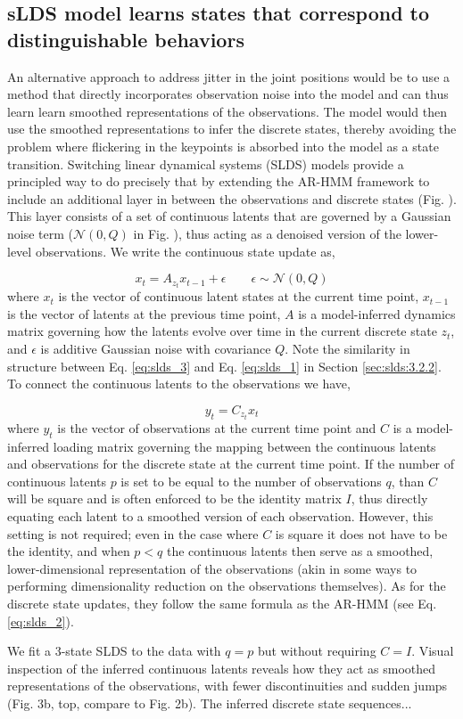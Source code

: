 \subsection{sLDS model learns states that correspond to distinguishable behaviors}
\label{sec:slds:3.2.3}
An alternative approach to address jitter in the joint positions would be to use a method that directly incorporates observation noise into the model and can thus learn learn smoothed representations of the observations. The model would then use the smoothed representations to infer the discrete states, thereby avoiding the problem where flickering in the keypoints is absorbed into the model as a state transition. Switching linear dynamical systems (SLDS) models provide a principled way to do precisely that by extending the AR-HMM framework to include an additional layer in between the observations and discrete states (Fig. ). This layer consists of a set of continuous latents that are governed by a Gaussian noise term ($\mathcal{N}(0,Q)$ in Fig. ), thus acting as a denoised version of the lower-level observations. We write the continuous state update as, 

\begin{equation} \label{eq:slds_3}
x_t = A_{z_t} x_{t-1} + \epsilon \qquad \epsilon \sim \mathcal{N}(0,Q)
\end{equation}
where $x_t$ is the vector of continuous latent states at the current time point, $x_{t-1}$ is the vector of latents at the previous time point, $A$ is a model-inferred dynamics matrix governing how the latents evolve over time in the current discrete state $z_t$, and $\epsilon$ is additive Gaussian noise with covariance $Q$. Note the similarity in structure between Eq. \ref{eq:slds_3} and Eq. \ref{eq:slds_1} in Section \ref{sec:slds:3.2.2}. To connect the continuous latents to the observations we have, 

\begin{equation} \label{eq:slds_4}
y_t = C_{z_t}x_{t} 
\end{equation}
where $y_t$ is the vector of observations at the current time point and $C$ is a model-inferred loading matrix governing the mapping between the continuous latents and observations for the discrete state at the current time point. If the number of continuous latents $p$ is set to be equal to the number of observations $q$, than $C$ will be square and is often enforced to be the identity matrix $I$, thus directly equating each latent to a smoothed version of each observation. However, this setting is not required; even in the case where $C$ is square it does not have to be the identity, and when $p<q$ the continuous latents then serve as a smoothed, lower-dimensional representation of the observations (akin in some ways to performing dimensionality reduction on the observations themselves). As for the discrete state updates, they follow the same formula as the AR-HMM (see Eq. \ref{eq:slds_2}). 

We fit a 3-state SLDS to the data with $q=p$ but without requiring $C=I$. Visual inspection of the inferred continuous latents reveals how they act as smoothed representations of the observations, with fewer discontinuities and sudden jumps (Fig. 3b, top, compare to Fig. 2b). The inferred discrete state sequences... 
